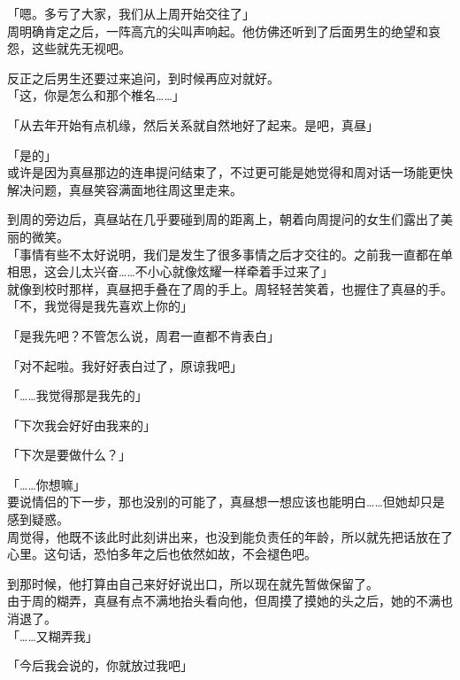 「嗯。多亏了大家，我们从上周开始交往了」\\

周明确肯定之后，一阵高亢的尖叫声响起。他仿佛还听到了后面男生的绝望和哀怨，这些就先无视吧。

反正之后男生还要过来追问，到时候再应对就好。\\

「这，你是怎么和那个椎名……」

「从去年开始有点机缘，然后关系就自然地好了起来。是吧，真昼」

「是的」\\

或许是因为真昼那边的连串提问结束了，不过更可能是她觉得和周对话一场能更快解决问题，真昼笑容满面地往周这里走来。

到周的旁边后，真昼站在几乎要碰到周的距离上，朝着向周提问的女生们露出了美丽的微笑。\\

「事情有些不太好说明，我们是发生了很多事情之后才交往的。之前我一直都在单相思，这会儿太兴奋……不小心就像炫耀一样牵着手过来了」\\

就像到校时那样，真昼把手叠在了周的手上。周轻轻苦笑着，也握住了真昼的手。\\

「不，我觉得是我先喜欢上你的」

「是我先吧？不管怎么说，周君一直都不肯表白」

「对不起啦。我好好表白过了，原谅我吧」

「……我觉得那是我先的」

「下次我会好好由我来的」

「下次是要做什么？」

「……你想嘛」\\

要说情侣的下一步，那也没别的可能了，真昼想一想应该也能明白……但她却只是感到疑惑。\\

周觉得，他既不该此时此刻讲出来，也没到能负责任的年龄，所以就先把话放在了心里。这句话，恐怕多年之后也依然如故，不会褪色吧。

到那时候，他打算由自己来好好说出口，所以现在就先暂做保留了。\\

由于周的糊弄，真昼有点不满地抬头看向他，但周摸了摸她的头之后，她的不满也消退了。\\

「……又糊弄我」

「今后我会说的，你就放过我吧」

